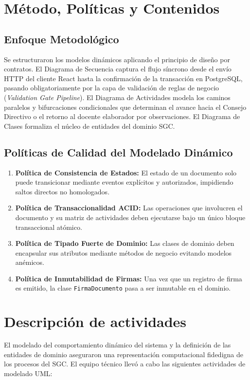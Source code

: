 \documentclass[12pt,a4paper]{article}
\begin{document}
\section{Método, Políticas y Contenidos}
\subsection{Enfoque Metodológico}
Se estructuraron los modelos dinámicos aplicando el principio de diseño por contratos. El Diagrama de Secuencia captura el flujo síncrono desde el envío HTTP del cliente React hasta la confirmación de la transacción en PostgreSQL, pasando obligatoriamente por la capa de validación de reglas de negocio (\textit{Validation Gate Pipeline}). El Diagrama de Actividades modela los caminos paralelos y bifurcaciones condicionales que determinan el avance hacia el Consejo Directivo o el retorno al docente elaborador por observaciones. El Diagrama de Clases formaliza el núcleo de entidades del dominio SGC.

\subsection{Políticas de Calidad del Modelado Dinámico}
\begin{enumerate}[leftmargin=1.5em, itemsep=2pt]
    \item \textbf{Política de Consistencia de Estados:} El estado de un documento solo puede transicionar mediante eventos explícitos y autorizados, impidiendo saltos directos no homologados.
    \item \textbf{Política de Transaccionalidad ACID:} Las operaciones que involucren el documento y su matriz de actividades deben ejecutarse bajo un único bloque transaccional atómico.
    \item \textbf{Política de Tipado Fuerte de Dominio:} Las clases de dominio deben encapsular sus atributos mediante métodos de negocio evitando modelos anémicos.
    \item \textbf{Política de Inmutabilidad de Firmas:} Una vez que un registro de firma es emitido, la clase \texttt{FirmaDocumento} pasa a ser inmutable en el dominio.
\end{enumerate}

\section{Descripción de actividades}
El modelado del comportamiento dinámico del sistema y la definición de las entidades de dominio aseguraron una representación computacional fidedigna de los procesos del SGC. El equipo técnico llevó a cabo las siguientes actividades de modelado UML:
\end{document}
